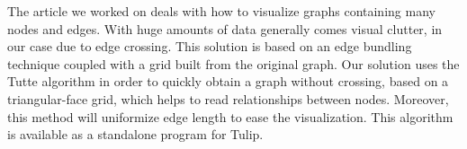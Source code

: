 The article we worked on deals with how to visualize graphs containing many nodes and edges. With huge amounts of data generally comes visual clutter, in our case due to edge crossing. This solution is based on an edge bundling technique coupled with a grid built from the original graph. Our solution uses the Tutte algorithm in order to quickly obtain a graph without crossing, based on a triangular-face grid, which helps to read relationships between nodes. Moreover, this method will uniformize edge length to ease the visualization. This algorithm is available as a standalone program for Tulip. 
